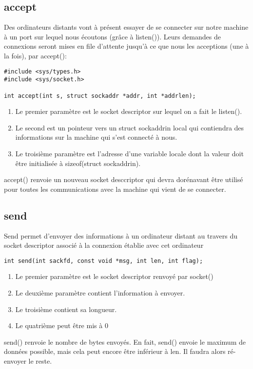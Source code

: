 \documentclass[a4paper]{article}
\begin{document}
\subsection{accept}
Des ordinateurs distants vont à présent essayer de se connecter sur notre machine à un port sur lequel nous écoutons (grâce à listen()). Leurs demandes de connexions seront mises en file d'attente jusqu'à ce que nous les acceptions (une à la fois), par accept():
\begin{lstlisting}
#include <sys/types.h>
#include <sys/socket.h>

int accept(int s, struct sockaddr *addr, int *addrlen);
\end{lstlisting}
\begin{enumerate}
  \item Le premier paramètre est le socket descriptor sur lequel on a fait le listen().
  \item Le second est un pointeur vers un struct sockaddr\textunderscore{}in local qui contiendra des informations sur la machine qui s'est connecté à nous.
  \item Le troisième paramètre est l'adresse d'une variable locale dont la valeur doit être initialisée à sizeof(struct sockaddr\textunderscore{}in).
\end{enumerate}
accept() renvoie un nouveau socket desccriptor qui devra dorénavant être utilisé pour toutes les communications avec la machine qui vient de se connecter.
\subsection{send}
Send permet d'envoyer des informations à un ordinateur distant au travers du socket descriptor associé à la connexion établie avec cet ordinateur
\begin{lstlisting}
int send(int sackfd, const void *msg, int len, int flag);
\end{lstlisting}
\begin{enumerate}
  \item Le premier paramètre est le socket descriptor renvoyé par socket()
  \item Le deuxième paramètre contient l'information à envoyer.
  \item Le troisième contient sa longueur.
  \item Le quatrième peut être mis à 0 
\end{enumerate}
send() renvoie le nombre de bytes envoyés. En fait, send() envoie le maximum de données possible, mais cela peut encore être inférieur à len. Il faudra alors ré-envoyer le reste.
\end{document}
